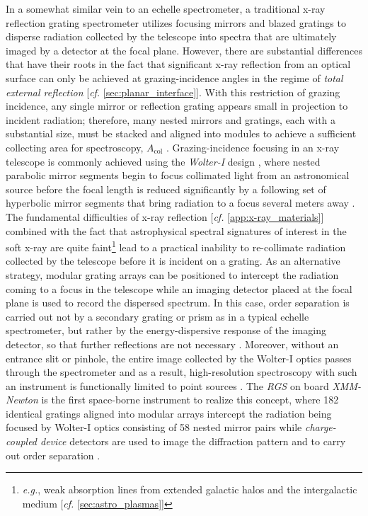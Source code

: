 In a somewhat similar vein to an echelle spectrometer, a traditional x-ray reflection grating spectrometer utilizes focusing mirrors and blazed gratings to disperse radiation collected by the telescope into spectra that are ultimately imaged by a detector at the focal plane. 
However, there are substantial differences that have their roots in the fact that significant x-ray reflection from an optical surface can only be achieved at grazing-incidence angles in the regime of \emph{total external reflection} [\emph{cf.\@} \cref{sec:planar_interface}]. %
With this restriction of grazing incidence, any single mirror or reflection grating appears small in projection to incident radiation; therefore, many nested mirrors and gratings, each with a substantial size, must be stacked and aligned into modules to achieve a sufficient collecting area for spectroscopy, $A_{\text{col}}$ \cite{Cash91,Kahn96,Allured13,Allured15,Donovan18,Shipley08,McEntaffer11}. 
Grazing-incidence focusing in an x-ray telescope is commonly achieved using the \emph{Wolter-I} design \cite{Wolter52}, where nested parabolic mirror segments begin to focus collimated light from an astronomical source before the focal length is reduced significantly by a following set of hyperbolic mirror segments that bring radiation to a focus several meters away \cite{Aschenbach85,schwartz_2011}. 
The fundamental difficulties of x-ray reflection [\emph{cf.\@} \cref{app:x-ray_materials}] combined with the fact that astrophysical spectral signatures of interest in the soft x-ray are quite faint\footnote{\emph{e.g.}, weak absorption lines from extended galactic halos and the intergalactic medium [\emph{cf.\@} \cref{sec:astro_plasmas}]} lead to a practical inability to re-collimate radiation collected by the telescope before it is incident on a grating. 
As an alternative strategy, modular grating arrays can be positioned to intercept the radiation coming to a focus in the telescope while an imaging detector placed at the focal plane is used to record the dispersed spectrum. %
In this case, order separation is carried out not by a secondary grating or prism as in a typical echelle spectrometer, but rather by the energy-dispersive response of the imaging detector, so that further reflections are not necessary \cite{Cash91}. 
Moreover, without an entrance slit or pinhole, the entire image collected by the Wolter-I optics passes through the spectrometer and as a result, high-resolution spectroscopy with such an instrument is functionally limited to point sources \cite{schwartz_2011}. 
The \emph{RGS} on board \emph{XMM-Newton} is the first space-borne instrument to realize this concept, where \num{182} identical gratings aligned into modular arrays intercept the radiation being focused by Wolter-I optics consisting of \num{58} nested mirror pairs while \emph{charge-coupled device} detectors are used to image the diffraction pattern and to carry out order separation \cite{Kahn96,denHerder01}. 

